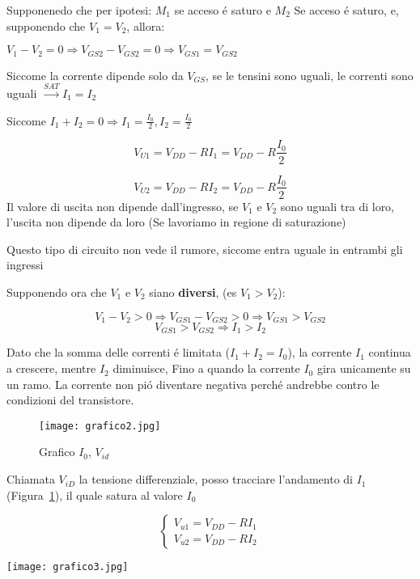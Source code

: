 Supponenedo che per ipotesi: $M_1$ se acceso \'e saturo e $M_2$ Se acceso \'e saturo, e, supponendo che $V_1 = V_2$, allora:

$V_1 - V_2 = 0 \Rightarrow V_{GS2} - V_{GS2} = 0 \Rightarrow V_{GS1} = V_{GS2} $

Siccome la corrente dipende solo da $V_{GS}$, se le tensini sono uguali, le correnti sono uguali $\xrightarrow{SAT} I_1 = I_2$

Siccome $I_1 + I_2 = 0 \Rightarrow I_1 = \frac{I_0}{2} , I_2 = \frac{I_0}{2}$

\[
    V_{U1} = V_{DD} - RI_1 = V_{DD} - R\frac{I_0 }{2}
\]

\[
    V_{U2} = V_{DD} - RI_2 = V_{DD} - R\frac{I_0 }{2}
\]
Il valore di uscita non dipende dall'ingresso, se $V_1$ e $V_2$ sono uguali tra di loro, l'uscita non dipende da loro (Se lavoriamo in regione di saturazione)

Questo tipo di circuito non vede il rumore, siccome entra uguale in entrambi gli ingressi

\vspace{20px}
Supponendo ora che $V_1$ e $V_2$ siano \textbf{diversi}, (es $V_1 > V_2$):

\[
    V_1 - V_2 > 0 \Rightarrow V_{GS1} - V_{GS2} > 0 \Rightarrow V_{GS1} > V_{GS2}
\]
\[
    V_{GS1} > V_{GS2} \Rightarrow I_1 > I_2
\]

Dato che la somma delle correnti \'e limitata ($I_1 + I_2 = I_0$), la corrente $I_1$ continua a crescere, mentre $I_2$ diminuisce, Fino a quando la corrente $I_0$ gira unicamente su un ramo. La corrente non pi\'o diventare negativa perch\'e andrebbe contro le condizioni del transistore.

\begin{figure}[ht]
    \centering
    \texttt{[image: grafico2.jpg]}
    \caption{Grafico $I_0$, $V_{id}$\label{grafico_analog}}
\end{figure}

Chiamata $V_{iD}$ la tensione differenziale, posso tracciare l'andamento di $I_1$ (Figura~\ref{grafico_analog}), il quale satura al valore $I_0$

\begin{minipage}[t]{0.45\textwidth}
\[
    \begin{cases}
    V_{u1} = V_{DD} - RI_1\\
    V_{u2} = V_{DD} - RI_2
    \end{cases}
\]
\end{minipage}
\begin{minipage}[c]{0.5\textwidth}
    \begin{center}
        \texttt{[image: grafico3.jpg]}
    \end{center}
\end{minipage}

